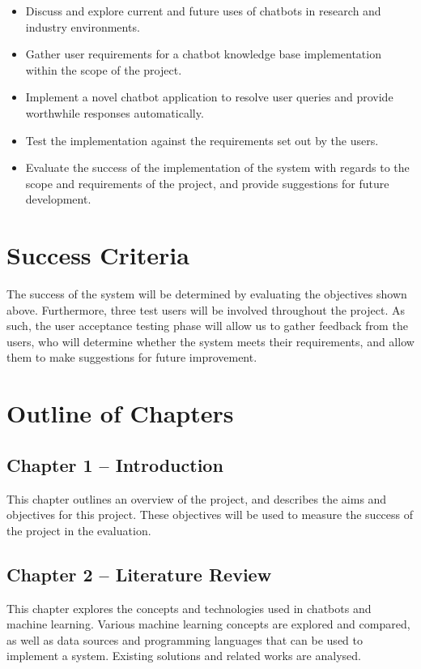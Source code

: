 \begin{itemize}
	\itemsep0em 
	\item Discuss and explore current and future uses of chatbots in research and industry environments.
	\item Gather user requirements for a chatbot knowledge base implementation within the scope of the project.
	\item Implement a novel chatbot application to resolve user queries and provide worthwhile responses automatically.
	\item Test the implementation against the requirements set out by the users.
	\item Evaluate the success of the implementation of the system with regards to the scope and requirements of the project, and provide suggestions for future development.
\end{itemize}

\section{Success Criteria}
The success of the system will be determined by evaluating the objectives shown above. Furthermore, three test users will be involved throughout the project. As such, the user acceptance testing phase will allow us to gather feedback from the users, who will determine whether the system meets their requirements, and allow them to make suggestions for future improvement.

\newpage
\section{Outline of Chapters}

\subsection*{Chapter 1 -- Introduction}
This chapter outlines an overview of the project, and describes the aims and objectives for this project. These objectives will be used to measure the success of the project in the evaluation.

\subsection*{Chapter 2 -- Literature Review}
This chapter explores the concepts and technologies used in chatbots and machine learning. Various machine learning concepts are explored and compared, as well as data sources and programming languages that can be used to implement a system. Existing solutions and related works are analysed.

